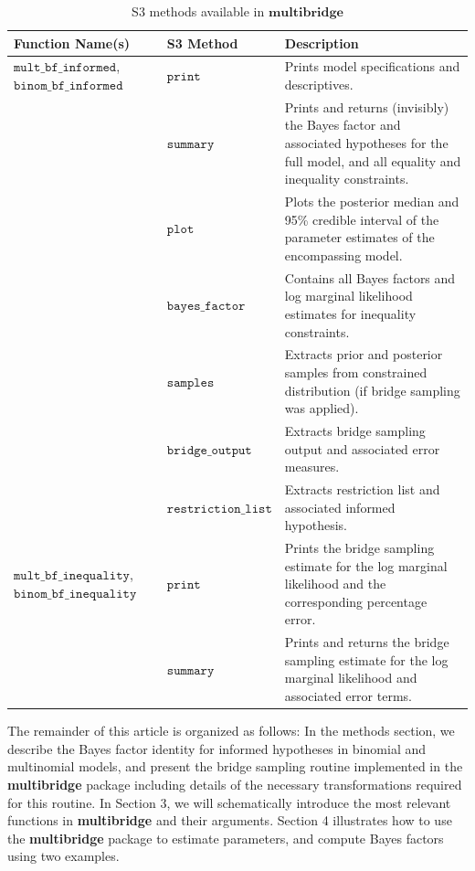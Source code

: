 \documentclass[
  english,
  man,floatsintext]{apa6}
\begin{document}
\begin{table}
\caption {S3 methods available in $\textbf{multibridge}$}
\label{table:s3_methods}
\begin{center}
\begin{tabular}{p{4cm}p{3.5cm}p{9cm}}
        \toprule
Function Name(s) & S3 Method & Description \\\midrule
$\texttt{mult\_bf\_informed}$, $\texttt{binom\_bf\_informed}$ & $\texttt{print}$ & Prints model specifications and descriptives. \\
 & $\texttt{summary}$ &  Prints and returns (invisibly) the Bayes factor and associated hypotheses for the full model, and all equality and inequality constraints.\\
  & $\texttt{plot}$ &  Plots the posterior median and 95\% credible interval of the parameter estimates of the encompassing model.\\
 & $\texttt{bayes\_factor}$ & Contains all Bayes factors and log marginal likelihood estimates for inequality constraints.\\
 & $\texttt{samples}$ & Extracts prior and posterior samples from constrained distribution (if bridge sampling was applied). \\
& $\texttt{bridge\_output}$    &  Extracts bridge sampling output and associated error measures.\\
& $\texttt{restriction\_list}$ & Extracts restriction list and associated informed hypothesis. \\
$\texttt{mult\_bf\_inequality}$, $\texttt{binom\_bf\_inequality}$  & $\texttt{print}$ & Prints the bridge sampling estimate for the log marginal likelihood and the corresponding percentage error. \\
& $\texttt{summary}$ & Prints and returns the bridge sampling estimate for the log marginal likelihood and associated error terms.\\
\bottomrule
\end{tabular}
\end{center}
\end{table}

The remainder of this article is organized as follows: In the methods section, we describe the Bayes factor identity for informed hypotheses in binomial and multinomial models, and present the bridge sampling routine implemented in the \textbf{multibridge} package including details of the necessary transformations required for this routine. In Section 3, we will schematically introduce the most relevant functions in \textbf{multibridge} and their arguments. Section 4 illustrates how to use the \textbf{multibridge} package to estimate parameters, and compute Bayes factors using two examples.
\end{document}
